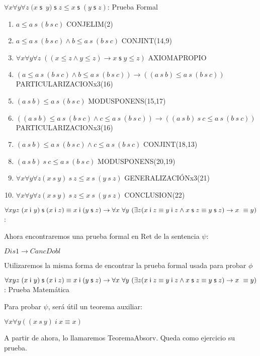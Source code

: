 \documentclass[10pt]{beamer}
\newcounter{saveenumi}
\newcommand{\seti}{\setcounter{saveenumi}{\value{enumi}}}
\newcommand{\conti}{\setcounter{enumi}{\value{saveenumi}}}
\newcommand{\Cfontb}{\fontsize{5.7}{9.5}\selectfont}
\newcommand{\Cfonti}{\fontsize{8.5}{7.2}\selectfont}
\newcommand{\Nand}{\wedge}
\newcommand{\sLesCot}{\forall x\forall y\forall z\;\left( (x\leq
z\wedge y\leq z)\rightarrow x\;\text{$\mathsf{s\;}$}y\leq z\right)}
\newcommand{\assoc}{\forall x\forall y\forall
z\;(x\;\mathsf{s}$\ $y)\;\mathsf{s}\;z\leq x\;\mathsf{s}\;(y\;\mathsf{s}\;z)}
\newcommand{\acot}{Dis1\rightarrow CancDobl}
\newcommand{\idistr}{\forall xyz\;(x\;\mathsf{i}\
y)\;\mathsf{s}\;(x\;\mathsf{i}\;z)\equiv x\;\mathsf{i}\;(y\;\mathsf{s}%
\;z)}
\newcommand{\myconj}{x\;\mathsf{i}\;z\equiv y\;\mathsf{%
i}\;z\wedge x\;\mathsf{s}\;z\equiv y\;\mathsf{s}\;z}
\begin{document}
\begin{frame}{$\assoc$: Prueba Formal}
\Cfontb

\begin{enumerate}[<+->]
  \conti
  \item $ a \leq a\ s\ (b\ s\ c)$ \hfill CONJELIM(2)

  \item $ a \leq a\ s\ (b\ s\ c) \Nand b \leq a\ s\ (b\ s\ c)$ \hfill CONJINT(14,9)
  \item $ \sLesCot $ \hfill AXIOMAPROPIO
  \item $ (a \leq a\ s\ (b\ s\ c) \Nand b \leq a\ s\ (b\ s\ c)) \rightarrow ((a\ s\ b) \leq a\ s\ (b\ s\ c)) $ \hfill PARTICULARIZACIONx3(16)
  \item $ (a\ s\ b) \leq a\ s\ (b\ s\ c)$ \hfill MODUSPONENS(15,17)

  \item $ ((a\ s\ b) \leq a\ s\ (b\ s\ c) \Nand c \leq a\ s\ (b\ s\ c)) \rightarrow ((a\ s\ b)\ s\ c \leq a\ s\ (b\ s\ c)) $ \hfill PARTICULARIZACIONx3(16)
  \item $ (a\ s\ b) \leq a\ s\ (b\ s\ c) \Nand c \leq a\ s\ (b\ s\ c) $ \hfill CONJINT(18,13)
  \item $ (a\ s\ b)\ s\ c \leq a\ s\ (b\ s\ c) $ \hfill MODUSPONENS(20,19)
  \item $ \forall x \forall y \forall z (x\ s\ y)\ s\ z \leq x\ s\ (y\ s\ z)$ \hfill GENERALIZACIÓNx3(21)
  \item $ \forall x \forall y \forall z (x\ s\ y)\ s\ z \leq x\ s\ (y\ s\ z)$ \hfill CONCLUSION(22)
  \seti
\end{enumerate}

\end{frame}



\begin{frame}{\Cfonti$\idistr \rightarrow \forall x\ \forall y\ (\exists z (\myconj) \rightarrow x\ \equiv y)$:}

  Ahora encontraremos una prueba formal en Ret de la sentencia $\psi$:
  \begin{center}
    $\acot$
  \end{center}
  \pause
  Utilizaremos la misma forma de encontrar la prueba formal usada para probar
  $\phi$

\end{frame}


\begin{frame}{\Cfonti$\idistr \rightarrow \forall x\ \forall y\ (\exists z (\myconj) \rightarrow x\ \equiv y)$: Prueba Matemática}

  Para probar $\psi$, será útil un teorema auxiliar:
  \begin{center}
    $\forall x \forall y ((x\ s\ y)\ i\ x \equiv x)$
  \end{center}
  A partir de ahora, lo llamaremos TeoremaAbsorv. Queda como ejercicio su prueba.

\end{frame}
\end{document}
